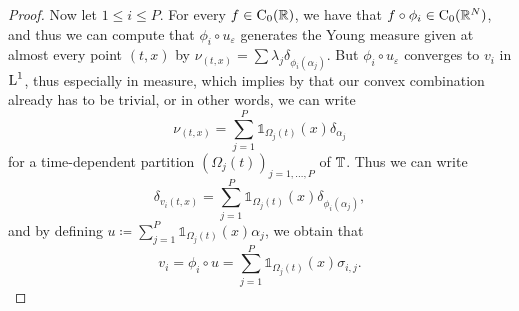 \begin{proof}
 	Now let $ 1 \leq i \leq P $. For every $ f \in \operatorname{C}_{ 0 } ( \mathbb{ R } ) $, we have that $ f \circ \phi_{ i } \in \operatorname{C}_{ 0 } ( \mathbb{ R }^{ N } ) $, and thus we can compute that $ \phi_{ i } \circ u_{ \varepsilon } $ generates the Young measure given at almost every point $ ( t, x ) $ by $ \nu_{ ( t , x ) } = \sum \lambda_{ j } \delta_{ \phi_{ i } ( \alpha_{ j } ) } $.
 	But $ \phi_{ i } \circ u_{ \varepsilon } $ converges to $ v_{ i } $ in $ \operatorname{L}^{ 1 } $, thus especially in measure, which implies by \cite[Cor.~3.2]{Müller1999} that our convex combination already has to be trivial, or in other words, we can write 
 	\begin{equation*}
 		\nu_{ ( t , x ) }
 		=
 		\sum_{ j= 1 }^{ P }
 			\mathds{ 1 }_{ \Omega_{ j } ( t ) } ( x )
 			\delta_{ \alpha_{ j } }
 	\end{equation*}
 	for a time-dependent partition $ ( \Omega_{ j } ( t ) )_{ j = 1 , \dotsc , P } $ of $ \operatorname{\mathbb{T}} $. Thus we can write 
 	\begin{equation*}
 		\delta_{ v_{ i } ( t , x ) }
 		=
 		\sum_{ j = 1 }^{ P }
 			\mathds{ 1 }_{ \Omega_{ j } ( t ) } ( x )
 			\delta_{ \phi_{ i } ( \alpha_{ j } ) },
 	\end{equation*}
 	and by defining 
 	$ u \coloneqq \sum_{ j = 1 }^{ P } \mathds{ 1 }_{ \Omega_{ j } ( t ) } ( x ) \alpha_{ j } $, 
 	we obtain that 
 	\begin{equation*} 
 		v_{ i } = 
 		\phi_{ i } \circ u  = \sum_{ j = 1 }^{ P } \mathds{ 1 }_{ \Omega_{ j } ( t ) } ( x ) \sigma_{ i , j } .
 	\end{equation*}
 

\end{proof}
